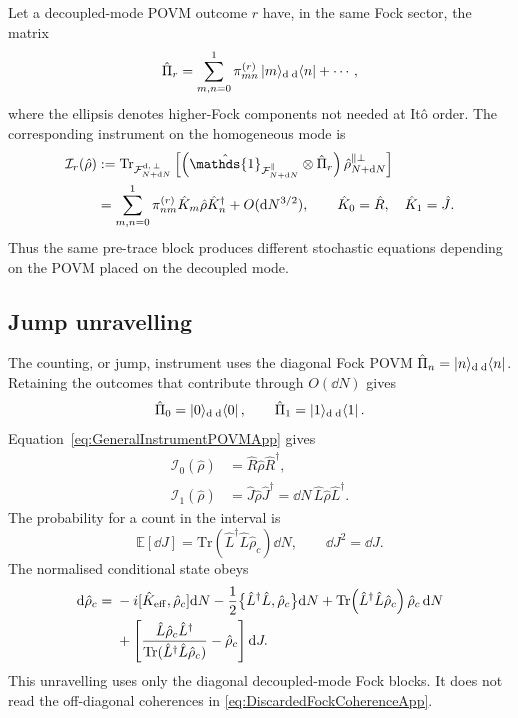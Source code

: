 \documentclass{article}
\def\cF{{\cal F}}
\newcommand{\openone}{\hat{\mathds{1}}}
\def\Tr{\mathrm{Tr}}
\numberwithin{equation}{section}
\begin{document}
	Let a decoupled-mode POVM outcome \(r\) have, in the same Fock sector, the matrix
	\begin{equation}
		\hat\Pi_r = \sum_{m,n=0}^{1} \pi_{mn}^{(r)} \ket{m}\!{}_{\rm d}\,{}_{\rm d}\!\bra{n} + \cdots ,
		\label{eq:GeneralPOVMBlockApp}
	\end{equation}
	where the ellipsis denotes higher-Fock components not needed at It\^o order. The corresponding instrument on the homogeneous mode is
	\begin{align}
		\mathcal I_r(\hat\rho) &:= \Tr_{\cF^{\rm d,\,\perp}_{N+\dd N}} \left[ \left( \openone_{\cF_{N+\dd N}^\parallel}\otimes\hat\Pi_r \right) \hat\rho_{N+\dd N}^{\parallel\perp} \right] \nonumber\\ &= \sum_{m,n=0}^{1} \pi_{nm}^{(r)} \hat K_m\hat\rho\hat K_n^\dagger + O(\dd N^{3/2}), \qquad \hat K_0=\hat R,\quad \hat K_1=\hat J .
		\label{eq:GeneralInstrumentPOVMApp}
	\end{align}
	Thus the same pre-trace block produces different stochastic equations depending on the POVM placed on the decoupled mode.

	\subsection{Jump unravelling}
	\label{appA:jump_unravelling}

	The counting, or jump, instrument uses the diagonal Fock POVM \(\hat\Pi_n=\ket{n}\!{}_{\rm d}\,{}_{\rm d}\!\bra{n}\). Retaining the outcomes that contribute through \(O(\dd N)\) gives
	\begin{equation}
		\hat\Pi_0=\ket{0}\!{}_{\rm d}\,{}_{\rm d}\!\bra{0}, \qquad \hat\Pi_1=\ket{1}\!{}_{\rm d}\,{}_{\rm d}\!\bra{1} .
		\label{eq:CountingPOVMApp}
	\end{equation}
	Equation~\eqref{eq:GeneralInstrumentPOVMApp} gives
	\begin{align}
		\mathcal I_0(\hat\rho) &= \hat R\hat\rho\hat R^\dagger,
		\label{eq:JumpNoCountInstrumentApp}
		\\ \mathcal I_1(\hat\rho) &= \hat J\hat\rho\hat J^\dagger = \dd N\,\hat L\hat\rho\hat L^\dagger .
		\label{eq:JumpCountInstrumentApp}
	\end{align}
	The probability for a count in the interval is
	\begin{equation}
		\mathbb E[\dd J] = \Tr\!\left( \hat L^\dagger\hat L\hat\rho_c \right)\dd N, \qquad \dd J^2=\dd J .
		\label{eq:JumpRateApp}
	\end{equation}
	The normalised conditional state obeys
	\begin{align}
		\dd\hat\rho_c ={}& -i[\hat K_{\rm eff},\hat\rho_c]\dd N - \frac12 \bigl\{ \hat L^\dagger\hat L,\hat\rho_c \bigr\}\dd N + \Tr\!\left( \hat L^\dagger\hat L\hat\rho_c \right)\hat\rho_c\,\dd N \nonumber\\ &+ \left[ \frac{ \hat L\hat\rho_c\hat L^\dagger }{ \Tr(\hat L^\dagger\hat L\hat\rho_c) } - \hat\rho_c \right]\dd J .
		\label{eq:JumpSMEApp}
	\end{align}
	This unravelling uses only the diagonal decoupled-mode Fock blocks. It does not read the off-diagonal coherences in \cref{eq:DiscardedFockCoherenceApp}.
\end{document}
